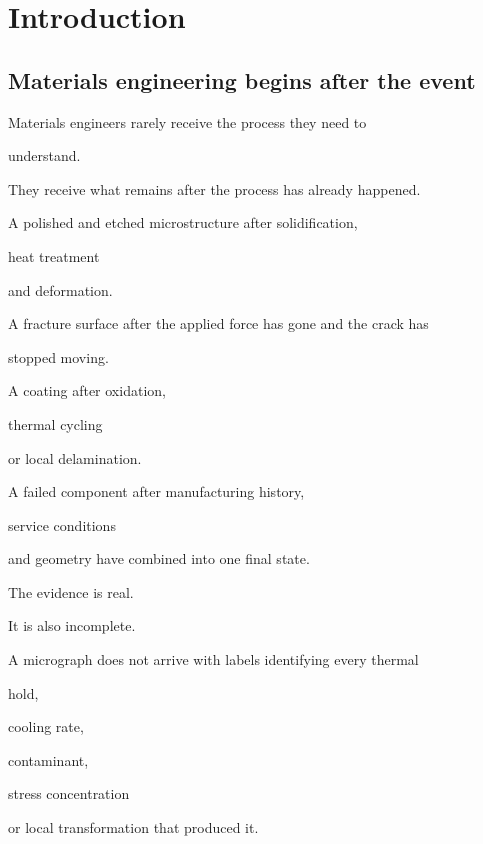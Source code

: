\documentclass[11pt,a4paper,oneside]{report}
\begin{document}
\chapter{Introduction}



\label{chap:introduction}



\section{Materials engineering begins after the event}



Materials engineers rarely receive the process they need to

understand.



They receive what remains after the process has already happened.



A polished and etched microstructure after solidification,

heat treatment

and deformation.



A fracture surface after the applied force has gone and the crack has

stopped moving.



A coating after oxidation,

thermal cycling

or local delamination.



A failed component after manufacturing history,

service conditions

and geometry have combined into one final state.



The evidence is real.



It is also incomplete.



A micrograph does not arrive with labels identifying every thermal

hold,

cooling rate,

contaminant,

stress concentration

or local transformation that produced it.
\end{document}
